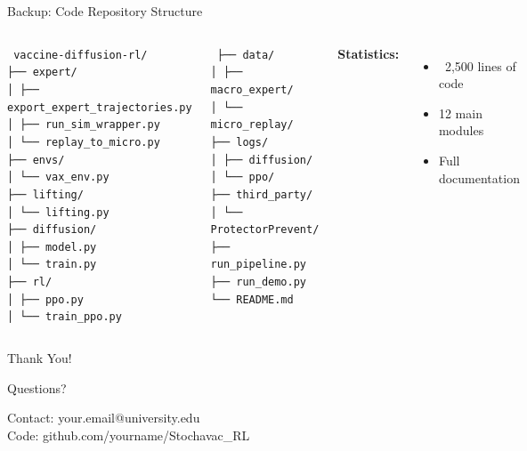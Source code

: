 \documentclass[aspectratio=169]{beamer}
\begin{document}
\begin{frame}{Backup: Code Repository Structure}

\begin{columns}
\footnotesize
\texttt{
vaccine-diffusion-rl/ \\
├── expert/ \\
│   ├── export\_expert\_trajectories.py \\
│   ├── run\_sim\_wrapper.py \\
│   └── replay\_to\_micro.py \\
├── envs/ \\
│   └── vax\_env.py \\
├── lifting/ \\
│   └── lifting.py \\
├── diffusion/ \\
│   ├── model.py \\
│   └── train.py \\
├── rl/ \\
│   ├── ppo.py \\
│   └── train\_ppo.py \\
}

\footnotesize
\texttt{
├── data/ \\
│   ├── macro\_expert/ \\
│   └── micro\_replay/ \\
├── logs/ \\
│   ├── diffusion/ \\
│   └── ppo/ \\
├── third\_party/ \\
│   └── ProtectorPrevent/ \\
├── run\_pipeline.py \\
├── run\_demo.py \\
└── README.md
}

\vspace{1em}
\textbf{Statistics:}
\begin{itemize}
    \item ~2,500 lines of code
    \item 12 main modules
    \item Full documentation
\end{itemize}

\end{columns}

\end{frame}

\begin{frame}[standout]
\Huge Thank You!

\vspace{2em}
\Large Questions?

\vspace{2em}
\normalsize
Contact: your.email@university.edu \\
Code: github.com/yourname/Stochavac\_RL
\end{frame}
\end{document}
